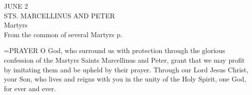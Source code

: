 \begin{center}\normalsize JUNE 2\\
\footnotesize STS. MARCELLINUS AND PETER\\
\footnotesize Martyrs\\
\footnotesize From the common of several Martyrs p. \\
\end{center}

\hangindent=\parindent \small{PRAYER 
O God, who surround us with protection
through the glorious confession
of the Martyrs Saints Marcellinus and Peter,
grant that we may profit by imitating them
and be upheld by their prayer.
Through our Lord Jesus Christ, your Son,
who lives and reigns with you in the unity of the Holy Spirit,
one God, for ever and ever.\\}
 
